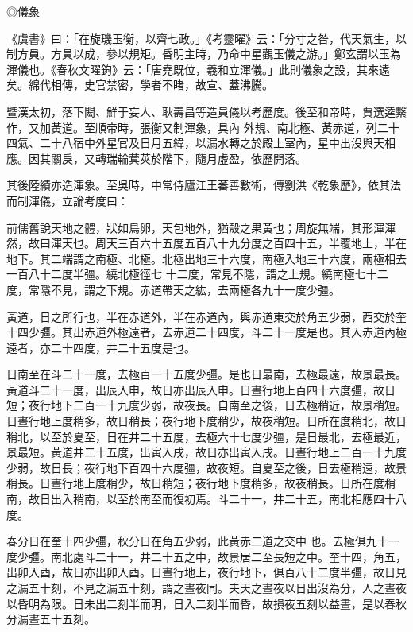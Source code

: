 \begin{pinyinscope}
{{ ◎儀象



 《虞書》曰：「在旋璣玉衡，以齊七政。」《考靈曜》云：「分寸之咎，代天氣生，以制方員。方員以成，參以規矩。昏明主時，乃命中星觀玉儀之游。」鄭玄謂以玉為渾儀也。《春秋文曜鉤》云：「唐堯既位，羲和立渾儀。」此則儀象之設，其來遠矣。綿代相傳，史官禁密，學者不睹，故宣、蓋沸騰。



 暨漢太初，落下閎、鮮于妄人、耿壽昌等造員儀以考歷度。後至和帝時，賈選逵繫作，又加黃道。至順帝時，張衡又制渾象，具內
 外規、南北極、黃赤道，列二十四氣、二十八宿中外星官及日月五緯，以漏水轉之於殿上室內，星中出沒與天相應。因其關戾，又轉瑞輪蓂莢於階下，隨月虛盈，依歷開落。



 其後陸績亦造渾象。至吳時，中常侍廬江王蕃善數術，傳劉洪《乾象歷》，依其法而制渾儀，立論考度曰：



 前儒舊說天地之體，狀如鳥卵，天包地外，猶殼之果黃也；周旋無端，其形渾渾然，故曰渾天也。周天三百六十五度五百八十九分度之百四十五，半覆地上，半在地下。其二端謂之南極、北極。北極出地三十六度，南極入地三十六度，兩極相去一百八十二度半彊。繞北極徑七
 十二度，常見不隱，謂之上規。繞南極七十二度，常隱不見，謂之下規。赤道帶天之紘，去兩極各九十一度少彊。



 黃道，日之所行也，半在赤道外，半在赤道內，與赤道東交於角五少弱，西交於奎十四少彊。其出赤道外極遠者，去赤道二十四度，斗二十一度是也。其入赤道內極遠者，亦二十四度，井二十五度是也。



 日南至在斗二十一度，去極百一十五度少彊。是也日最南，去極最遠，故景最長。黃道斗二十一度，出辰入申，故日亦出辰入申。日晝行地上百四十六度彊，故日短；夜行地下二百一十九度少弱，故夜長。自南至之後，日去極稍近，故景稍短。
 日晝行地上度稍多，故日稍長；夜行地下度稍少，故夜稍短。日所在度稍北，故日稍北，以至於夏至，日在井二十五度，去極六十七度少彊，是日最北，去極最近，景最短。黃道井二十五度，出寅入戌，故日亦出寅入戌。日晝行地上二百一十九度少弱，故日長；夜行地下百四十六度彊，故夜短。自夏至之後，日去極稍遠，故景稍長。日晝行地上度稍少，故日稍短；夜行地下度稍多，故夜稍長。日所在度稍南，故日出入稍南，以至於南至而復初焉。斗二十一，井二十五，南北相應四十八度。



 春分日在奎十四少彊，秋分日在角五少弱，此黃赤二道之交中
 也。去極俱九十一度少彊。南北處斗二十一，井二十五之中，故景居二至長短之中。奎十四，角五，出卯入酉，故日亦出卯入酉。日晝行地上，夜行地下，俱百八十二度半彊，故日見之漏五十刻，不見之漏五十刻，謂之晝夜同。夫天之晝夜以日出沒為分，人之晝夜以昏明為限。日未出二刻半而明，日入二刻半而昏，故損夜五刻以益晝，是以春秋分漏晝五十五刻。



}}
\end{pinyinscope}
